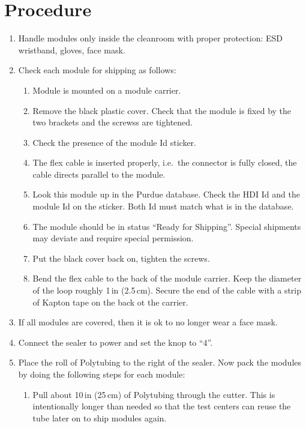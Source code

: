 \documentclass[12pt]{unlsilabsop}
\begin{document}
\section{Procedure}

\begin{enumerate}
    \item Handle modules only inside the cleanroom with proper protection: ESD wristband, gloves, face mask.
    \item Check each module for shipping as follows:
    \begin{enumerate}
        \item Module is mounted on a module carrier.
        \item Remove the black plastic cover. Check that the module is fixed by the two brackets and the screwss are tightened.
        \item Check the presence of the module Id sticker.
        \item The flex cable is inserted properly, i.e.~the connector is fully closed, the cable directs parallel to the module.
        \item Look this module up in the Purdue database. Check the HDI Id and the module Id on the sticker. Both Id must match what is in the database.
        \item The module should be in status ``Ready for Shipping''. Special shipments may deviate and require special permission.
        \item Put the black cover back on, tighten the screws.
        \item Bend the flex cable to the back of the module carrier. Keep the diameter of the loop roughly 1\,in (2.5\,cm). Secure the end of the cable with a strip of Kapton tape on the back ot the carrier.
    \end{enumerate}
    \item If all modules are covered, then it is ok to no longer wear a face mask.
    \item Connect the sealer to power and set the knop to ``4''.
    \item Place the roll of Polytubing to the right of the sealer. Now pack the modules by doing the following steps for each module:
    \begin{enumerate}
        \item Pull about 10\,in (25\,cm) of Polytubing through the cutter. This is intentionally longer than needed so that the test centers can reuse the tube later on to ship modules again.

\end{enumerate}
\end{enumerate}
\end{document}
